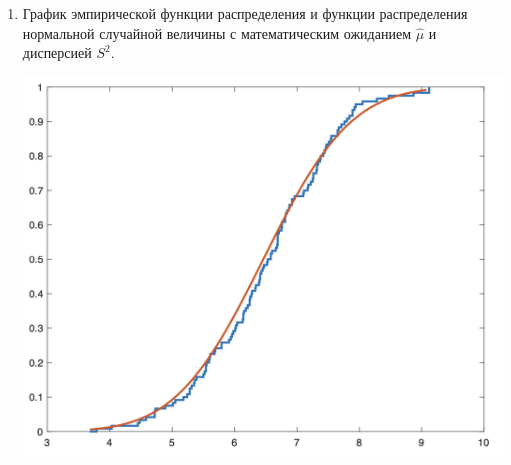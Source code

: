 \documentclass[a4paper,14pt]{extreport} %
\begin{document}
\begin{enumerate}
\newpage

\item График эмпирической функции распределения и функции распределения нормальной случайной величины с математическим ожиданием $\hat \mu$ и дисперсией $S^2$. 

\includegraphics[scale=0.9]{graph2}

\end{enumerate}
\end{document}
